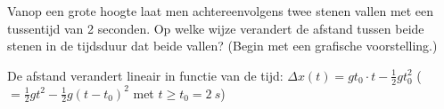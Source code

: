 

\item[\SI{80}{\percent} (b)]Vanop een grote hoogte laat men achtereenvolgens twee stenen vallen met een tussentijd van 2 seconden. Op welke wijze verandert de afstand tussen beide stenen in de tijdsduur dat beide vallen? (Begin met een grafische voorstelling.) 

\begin{oplossing}
	De afstand verandert lineair in functie van de tijd: $\Delta x(t)=gt_0\cdot t-\frac{1}{2}gt_0^2$ ($=\frac{1}{2}gt^2-\frac{1}{2}g(t-t_0)^2$ met $t\geq t_0=\SI{2}{s}$)
\end{oplossing}